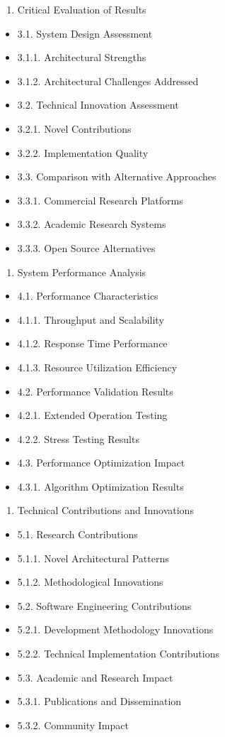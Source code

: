 \documentclass[12pt,a4paper]{report}
\begin{document}
\begin{enumerate}
\item Critical Evaluation of Results
\end{enumerate}
\begin{itemize}
\item 3.1. System Design Assessment
\item 3.1.1. Architectural Strengths
\item 3.1.2. Architectural Challenges Addressed
\item 3.2. Technical Innovation Assessment
\item 3.2.1. Novel Contributions
\item 3.2.2. Implementation Quality
\item 3.3. Comparison with Alternative Approaches
\item 3.3.1. Commercial Research Platforms
\item 3.3.2. Academic Research Systems
\item 3.3.3. Open Source Alternatives
\end{itemize}
\begin{enumerate}
\item System Performance Analysis
\end{enumerate}
\begin{itemize}
\item 4.1. Performance Characteristics
\item 4.1.1. Throughput and Scalability
\item 4.1.2. Response Time Performance
\item 4.1.3. Resource Utilization Efficiency
\item 4.2. Performance Validation Results
\item 4.2.1. Extended Operation Testing
\item 4.2.2. Stress Testing Results
\item 4.3. Performance Optimization Impact
\item 4.3.1. Algorithm Optimization Results
\end{itemize}
\begin{enumerate}
\item Technical Contributions and Innovations
\end{enumerate}
\begin{itemize}
\item 5.1. Research Contributions
\item 5.1.1. Novel Architectural Patterns
\item 5.1.2. Methodological Innovations
\item 5.2. Software Engineering Contributions
\item 5.2.1. Development Methodology Innovations
\item 5.2.2. Technical Implementation Contributions
\item 5.3. Academic and Research Impact
\item 5.3.1. Publications and Dissemination
\item 5.3.2. Community Impact
\end{itemize}
\end{document}
